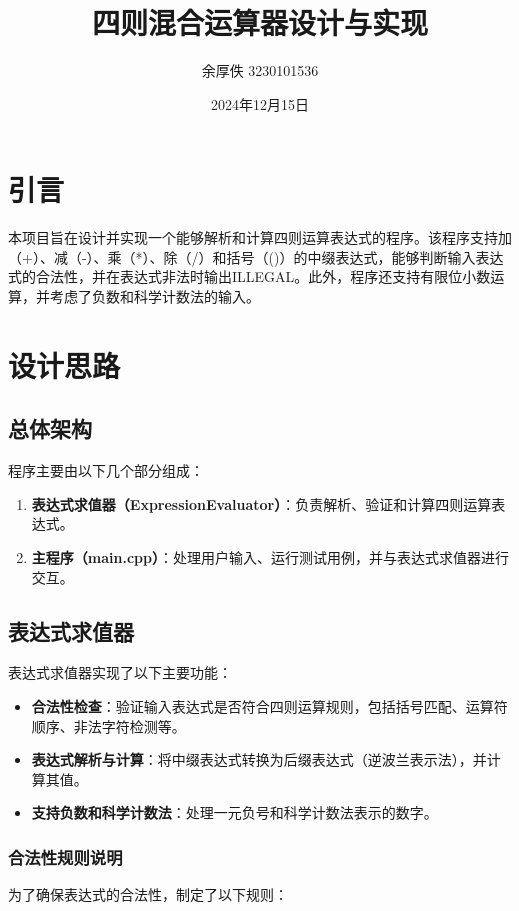 \documentclass{article}
\title{四则混合运算器设计与实现}
\author{余厚佚 3230101536}
\date{2024年12月15日}
\begin{document}
    \maketitle

    \section{引言}
    本项目旨在设计并实现一个能够解析和计算四则运算表达式的程序。该程序支持加（+）、减（-）、乘（*）、除（/）和括号（()）的中缀表达式，能够判断输入表达式的合法性，并在表达式非法时输出ILLEGAL。此外，程序还支持有限位小数运算，并考虑了负数和科学计数法的输入。

    \section{设计思路}
    \subsection{总体架构}
    程序主要由以下几个部分组成：
    \begin{enumerate}
        \item \textbf{表达式求值器（ExpressionEvaluator）}：负责解析、验证和计算四则运算表达式。
        \item \textbf{主程序（main.cpp）}：处理用户输入、运行测试用例，并与表达式求值器进行交互。
    \end{enumerate}



    \subsection{表达式求值器}
    表达式求值器实现了以下主要功能：
    \begin{itemize}
        \item \textbf{合法性检查}：验证输入表达式是否符合四则运算规则，包括括号匹配、运算符顺序、非法字符检测等。
        \item \textbf{表达式解析与计算}：将中缀表达式转换为后缀表达式（逆波兰表示法），并计算其值。
        \item \textbf{支持负数和科学计数法}：处理一元负号和科学计数法表示的数字。
    \end{itemize}


\subsubsection{合法性规则说明}
为了确保表达式的合法性，制定了以下规则：
\end{document}
